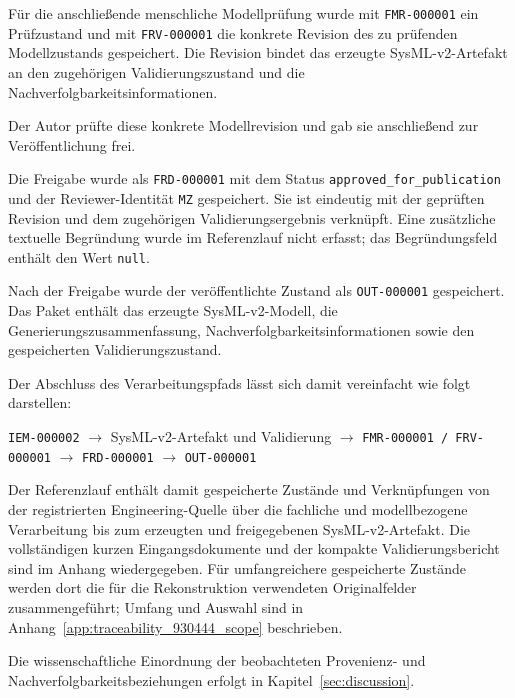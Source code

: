Für die anschließende menschliche Modellprüfung wurde mit
\texttt{FMR-000001} ein Prüfzustand und mit \texttt{FRV-000001} die
konkrete Revision des zu prüfenden Modellzustands gespeichert. Die Revision
bindet das erzeugte SysML-v2-Artefakt an den zugehörigen
Validierungszustand und die Nachverfolgbarkeitsinformationen.

Der Autor prüfte diese konkrete Modellrevision und gab sie anschließend zur
Veröffentlichung frei. 

\noindent Die Freigabe wurde als \texttt{FRD-000001} mit dem
Status \texttt{approved\_for\_publication} und der Reviewer-Identität
\texttt{MZ} gespeichert. Sie ist eindeutig mit der geprüften Revision und
dem zugehörigen Validierungsergebnis verknüpft. Eine zusätzliche textuelle
Begründung wurde im Referenzlauf nicht erfasst; das Begründungsfeld enthält
den Wert \texttt{null}.

Nach der Freigabe wurde der veröffentlichte Zustand als
\texttt{OUT-000001} gespeichert. Das Paket enthält das erzeugte
SysML-v2-Modell, die Generierungszusammenfassung,
Nachverfolgbarkeitsinformationen sowie den gespeicherten
Validierungszustand.

Der Abschluss des Verarbeitungspfads lässt sich damit vereinfacht wie folgt
darstellen:

\begin{center}
\small
\texttt{IEM-000002}
$\rightarrow$
SysML-v2-Artefakt und Validierung
$\rightarrow$
\texttt{FMR-000001 / FRV-000001}
$\rightarrow$
\texttt{FRD-000001}
$\rightarrow$
\texttt{OUT-000001}
\end{center}

Der Referenzlauf enthält damit gespeicherte Zustände und Verknüpfungen von
der registrierten Engineering-Quelle über die fachliche und modellbezogene
Verarbeitung bis zum erzeugten und freigegebenen SysML-v2-Artefakt. Die
vollständigen kurzen Eingangsdokumente und der kompakte Validierungsbericht
sind im Anhang wiedergegeben. Für umfangreichere gespeicherte Zustände
werden dort die für die Rekonstruktion verwendeten Originalfelder
zusammengeführt; Umfang und Auswahl sind in
Anhang~\ref{app:traceability_930444_scope} beschrieben.

Die wissenschaftliche Einordnung der beobachteten Provenienz- und
Nachverfolgbarkeitsbeziehungen erfolgt in
Kapitel~\ref{sec:discussion}.